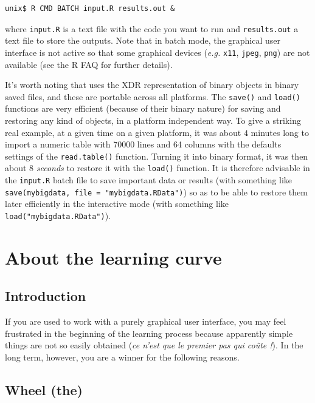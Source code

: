 \documentclass{article}
\begin{document}
\begin{verbatim}
unix$ R CMD BATCH input.R results.out &
\end{verbatim}

where \texttt{input.R} is a text file with the \Rlogo{} code you want to run and
\texttt{results.out} a text file to store the outputs. Note that in batch mode,
the graphical user interface is not active so that some graphical devices 
(\textit{e.g.} \texttt{x11}, \texttt{jpeg}, \texttt{png}) are not
available (see the R FAQ \cite{RFAQ} for further details).

It's worth noting that \Rlogo{} uses the XDR representation of binary objects in binary saved files, 
and these are portable across all \Rlogo{} platforms. The \texttt{save()} and \texttt{load()}
functions are very efficient (because of their binary nature) for saving and restoring any 
kind of \Rlogo{} objects, in a platform independent way. To give a striking real example, at a given time
on a given platform, it was about $4$ minutes long to import a numeric table with 70000 lines and 64 columns
with the defaults settings of the \texttt{read.table()} function. Turning it into binary format,
it was then about $8$ \emph{seconds} to restore it with the \texttt{load()} function.
It is therefore advisable in the \texttt{input.R} batch file to save important data or
results (with something like \texttt{save(mybigdata, file = "mybigdata.RData")})
so as to be able to restore them later efficiently in the interactive mode (with something
like \texttt{load("mybigdata.RData")}).


\section{About the learning curve}

\subsection*{Introduction}

If you are used to work with a purely graphical user interface, you may feel frustrated in the
beginning of the learning process because apparently simple things are not so easily
obtained (\textit{ce n'est que le premier pas qui co{\^{u}te} !}).
In the long term, however, you are a winner for the following reasons.

\subsection{Wheel (the)}
\end{document}
